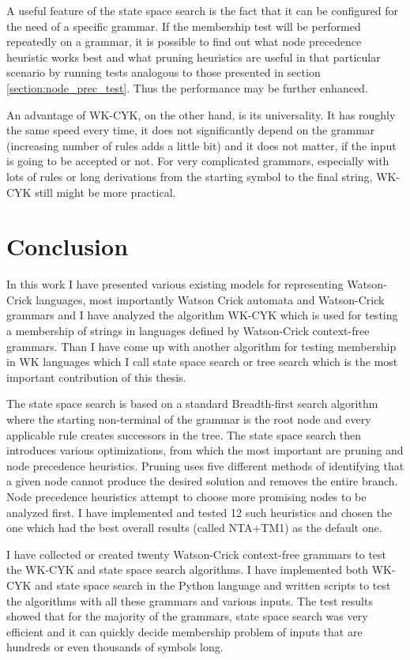 A useful feature of the state space search is the fact that it can be configured for the need of a specific grammar. If the membership test will be performed repeatedly on a grammar, it is possible to find out what node precedence heuristic works best and what pruning heuristics are useful in that particular scenario by running tests analogous to those presented in section \ref{section:node_prec_test}. Thus the performance may be further enhanced.

An advantage of WK-CYK, on the other hand, is its universality. It has roughly the same speed every time, it does not significantly depend on the grammar (increasing number of rules adds a little bit) and it does not matter, if the input is going to be accepted or not. For very complicated grammars, especially with lots of rules or long derivations from the starting symbol to the final string, WK-CYK still might be more practical.

\chapter{Conclusion}
In this work I have presented various existing models for representing Watson-Crick languages, most importantly Watson Crick automata and Watson-Crick grammars and I have analyzed the algorithm WK-CYK which is used for testing a membership of strings in languages defined by Watson-Crick context-free grammars. Than I have come up with another algorithm for testing membership in WK languages which I call state space search or tree search which is the most important contribution of this thesis.

The state space search is based on a standard Breadth-first search algorithm where the starting non-terminal of the grammar is the root node and every applicable rule creates successors in the tree. The state space search then introduces various optimizations, from which the most important are pruning and node precedence heuristics. Pruning uses five different methods of identifying that a given node cannot produce the desired solution and removes the entire branch. Node precedence heuristics attempt to choose more promising nodes to be analyzed first. I have implemented and tested 12 such heuristics and chosen the one which had the best overall results (called NTA+TM1) as the default one.

I have collected or created twenty Watson-Crick context-free grammars to test the WK-CYK and state space search algorithms.
I have implemented both WK-CYK and state space search in the Python language and written scripts to test the algorithms with all these grammars and various inputs. The test results showed that for the majority of the grammars, state space search was very efficient and it can quickly decide membership problem of inputs that are hundreds or even thousands of symbols long.

